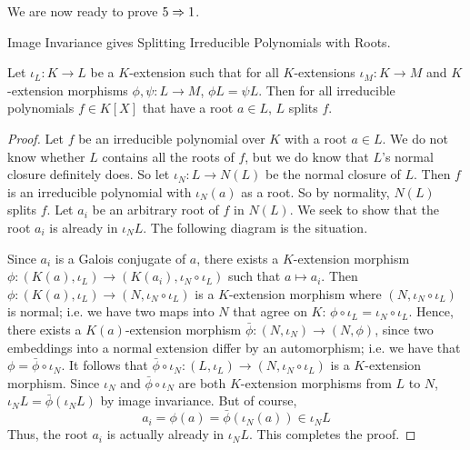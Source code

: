 \documentclass[../book.tex]{subfiles}
\begin{document}
We are now ready to prove $5 \Rightarrow 1$. 
\begin{thm} Image Invariance gives Splitting Irreducible Polynomials with Roots.
    
    Let $\iota_L : K \to L$ be a $K$-extension such that
    for all $K$-extensions $\iota_M : K \to M$ and 
    $K$-extension morphisms $\phi, \psi : L \to M$, $\phi L = \psi L$. 
    Then for all irreducible polynomials $f \in K[X]$ that have a root $a \in L$, 
    $L$ splits $f$. 
\end{thm}
\begin{proof}
    Let $f$ be an irreducible polynomial over $K$ with a root $a \in L$. 
    We do not know whether $L$ contains all the roots of $f$, 
    but we do know that $L$'s normal closure definitely does. 
    So let $\iota_N : L \to N(L)$ be the normal closure of $L$. 
    Then $f$ is an irreducible polynomial with $\iota_N(a)$ as a root.
    So by normality, $N(L)$ splits $f$. 
    Let $a_i$ be an arbitrary root of $f$ in $N(L)$. 
    We seek to show that the root $a_i$ is already in $\iota_N L$. 
    The following diagram is the situation. 
    \begin{figure} [H]
        \centering
    \end{figure}
    Since $a_i$ is a Galois conjugate of $a$, 
    there exists a $K$-extension morphism 
    $\phi : (K(a),\iota_L) \to (K(a_i),\iota_N\circ\iota_L)$ 
    such that $a \mapsto a_i$. 
    Then $\phi : (K(a),\iota_L) \to (N,\iota_N\circ\iota_L)$
    is a $K$-extension morphism where $(N,\iota_N\circ\iota_L)$ is normal;
    i.e. we have two maps into $N$ that agree on 
    $K$: $\phi \circ \iota_L = \iota_N \circ \iota_L$.
    Hence, there exists a $K(a)$-extension morphism 
    $\bar\phi : (N,\iota_N) \to (N,\phi)$,
    since two embeddings into a normal extension differ by an automorphism;
    i.e. we have that $\phi = \bar\phi \circ \iota_N$.
    It follows that 
    $\bar\phi\circ\iota_N : (L,\iota_L) \to (N,\iota_N\circ\iota_L)$
    is a $K$-extension morphism. 
    Since $\iota_N$ and $\bar\phi\circ\iota_N$ are 
    both $K$-extension morphisms from $L$ to $N$,
    $\iota_N L = \bar\phi(\iota_N L)$ by image invariance.
    But of course, 
    \[ a_i = \phi(a) = \bar\phi(\iota_N(a)) \in \iota_N L\]
    Thus, the root $a_i$ is actually already in $\iota_N L$.
    This completes the proof. 
\end{proof}
\end{document}

